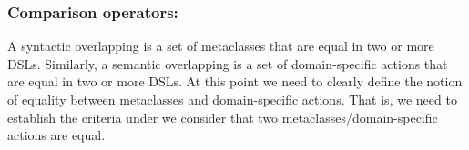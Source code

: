 


\subsubsection{Comparison operators:} A syntactic overlapping is a set of metaclasses that are equal in two or more DSLs. Similarly, a semantic overlapping is a set of domain-specific actions that are equal in two or more DSLs. At this point we need to clearly define the notion of equality between metaclasses and domain-specific actions. That is, we need to establish the criteria under we consider that two metaclasses/domain-specific actions are equal.

